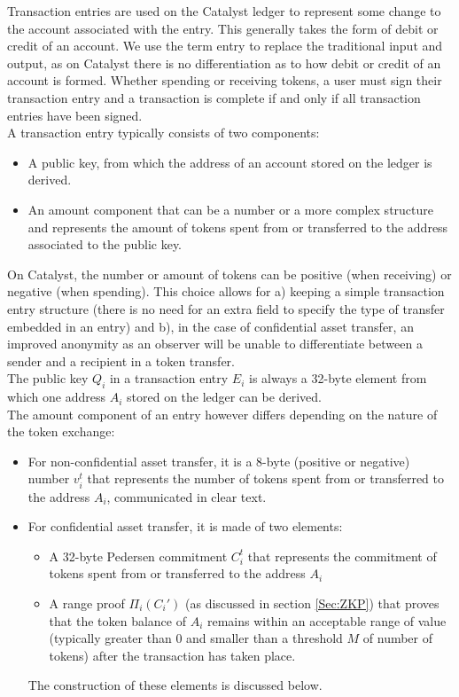Transaction entries are used on the Catalyst ledger to represent some change to the account associated with the entry. This generally takes the form of debit or credit of an account. We use the term entry to replace the traditional input and output, as on Catalyst there is no differentiation as to how debit or credit of an account is formed. Whether spending or receiving tokens, a user must sign their transaction entry and a transaction is complete if and only if all transaction entries have been signed.\\

 A transaction entry typically consists of two components: 
 \begin{itemize}
\item A public key, from which the address of an account stored on the ledger is derived.
\item An amount component that can be a number or a more complex structure and represents the amount of tokens spent from or transferred to the address associated to the public key.
\end{itemize}
On Catalyst, the number  or amount of tokens can be positive (when receiving) or negative (when spending). This  choice allows for a) keeping a simple transaction entry structure (there is no need for an extra field to specify the type of transfer embedded in an entry) and b), in the case of confidential asset transfer, an improved anonymity as an observer will be unable to differentiate between a sender and a recipient in a token transfer. \\

The public key $Q_i$ in a transaction entry $E_i$ is always a 32-byte element from which one address $A_i$ stored on the ledger can be derived. \\

The amount component of an entry however differs depending on the nature of the token exchange:

\begin{itemize}
\item For non-confidential asset transfer, it is a 8-byte (positive or negative) number $v^t_i$ that represents the number of tokens spent from or transferred to the address $A_i$, communicated in clear text.
\item For confidential asset transfer, it is made of two elements: 
\begin{itemize}
\item A 32-byte Pedersen commitment $C_{i}^{t}$ that represents the commitment of tokens spent from or transferred to the address $A_i$ 
\item A range proof $\Pi_i(C_{i}')$ (as discussed in section \ref{Sec:ZKP}) that proves that the token balance of $A_i$ remains within an acceptable range of value (typically greater than 0 and smaller than a threshold $M$ of number of tokens) after the transaction has taken place.
\end{itemize}
 The construction of these elements is discussed below. 
\end{itemize}


